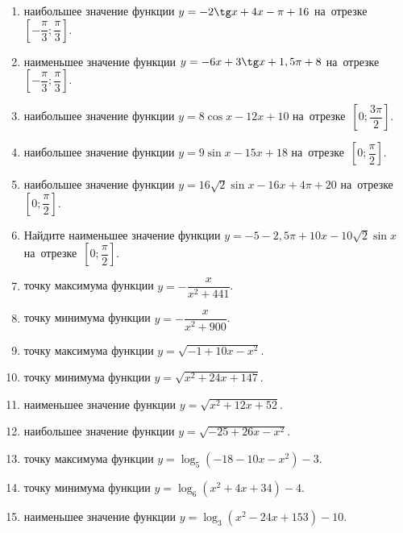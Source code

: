 \documentclass[a4paper,10pt]{article}
\begin{document}
\begin{enumerate}
\item {} наибольшее значение функции $y=-2\tg x +4x-\pi +16$ на~отрезке~$\left[-\dfrac{\pi}{3};\dfrac{\pi}{3}\right]$.

\item {} наименьшее значение функции $y=-6x +3\tg x+1,5\pi+8$ на~отрезке~$\left[-\dfrac{\pi}{3};\dfrac{\pi}{3}\right]$.

\item {} наибольшее значение функции $y=8\cos x-12x+10$ на~отрезке~$\left[0;\dfrac{3\pi}{2}\right]$.

\item {} наибольшее значение функции $y=9\sin x-15x+18$ на~отрезке~$\left[0;\dfrac{\pi}{2}\right]$.

\item {} наибольшее значение функции $y=16\sqrt{2}\sin x-16x+4\pi +20$ на~отрезке~$\left[0;\dfrac{\pi}{2}\right]$.

\item Найдите наименьшее значение функции $y=-5-2,5\pi+10x-10\sqrt{2}\sin x$ на~отрезке~$\left[0;\dfrac{\pi}{2}\right]$.

\item {} точку максимума функции $y=-\dfrac{x}{ x^2 +441}$.

\item {} точку минимума функции $y=-\dfrac{x}{ x^2 +900}$.

\item {} точку максимума функции $y=\sqrt{-1+10x-x^2}$.

\item {} точку минимума функции $y=\sqrt{x^2+24x+147}$.

\item {} наименьшее значение функции $y=\sqrt{x^2+12x+52}$.

\item {} наибольшее значение функции $y=\sqrt{-25+26x-x^2}$.

\item {} точку максимума функции $y=\log_5\left(-18-10x-x^2\right)-3$.

\item {} точку минимума функции $y=\log_6\left(x^2+4x+34\right)-4$.

\item {} наименьшее значение функции $y=\log_3\left(x^2-24x+153\right)-10$.


\end{enumerate}
\end{document}
